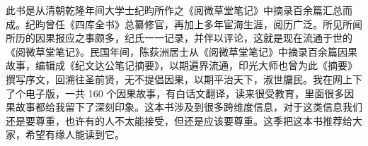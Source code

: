 \begin{book}[《纪文达公笔记摘要》]
    此书是从清朝乾隆年间大学士纪昀所作之《阅微草堂笔记》中摘录百余篇汇总而成。纪昀曾任《四库全书》总纂修官，再加上多年宦海生涯，阅历广泛。所见所闻所历的因果报应之事颇多，纪氏一一记录，并伴以评论，这就是现在流通于世的《阅微草堂笔记》。民国年间，陈荻洲居士从《阅微草堂笔记》中摘录百余篇因果故事，编辑成《纪文达公笔记摘要》，以期遍界流通，印光大师也曾为此《摘要》撰写序文，回溯往圣前贤，无不提倡因果，以期平治天下，淑世牖民。我在网上下了个电子版，一共 160 个因果故事，有白话文翻译，读来很受教育，里面很多因果故事都给我留下了深刻印象。这本书涉及到很多跨维度信息，对于这类信息我们还是要尊重，也许有的人不太能接受，但还是应该要尊重。这季把这本书推荐给大家，希望有缘人能读到它。
\end{book}
